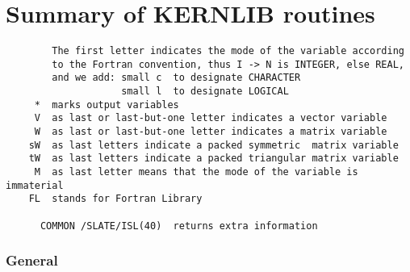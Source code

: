 \chapter{Summary of KERNLIB routines}


\begin{verbatim}
        The first letter indicates the mode of the variable according
        to the Fortran convention, thus I -> N is INTEGER, else REAL,
        and we add: small c  to designate CHARACTER
                    small l  to designate LOGICAL
     *  marks output variables
     V  as last or last-but-one letter indicates a vector variable
     W  as last or last-but-one letter indicates a matrix variable
    sW  as last letters indicate a packed symmetric  matrix variable
    tW  as last letters indicate a packed triangular matrix variable
     M  as last letter means that the mode of the variable is immaterial
    FL  stands for Fortran Library

      COMMON /SLATE/ISL(40)  returns extra information
\end{verbatim}

\subsection*{General}


